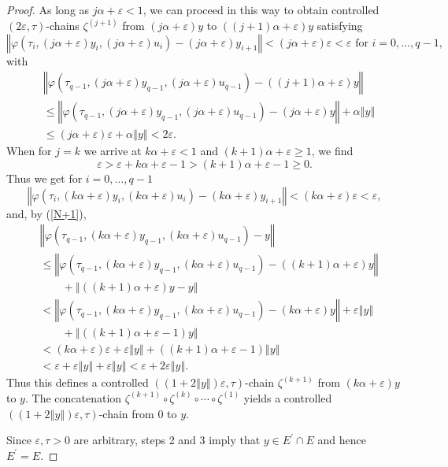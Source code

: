 \documentclass[10pt,a4paper]{amsart}
\begin{document}
\begin{proof}
As long as $j\alpha+\varepsilon<1$, we can proceed in this way to obtain
controlled $(2\varepsilon,\tau)$-chains $\zeta^{(j+1)}$ from $(j\alpha
+\varepsilon)y$ to $((j+1)\alpha+\varepsilon)y$ satisfying%
\[
\left\Vert \varphi(\tau_{i},(j\alpha+\varepsilon)y_{i},(j\alpha+\varepsilon
)u_{i})-(j\alpha+\varepsilon)y_{i+1}\right\Vert <(j\alpha+\varepsilon
)\varepsilon<\varepsilon\text{ for }i=0,\ldots,q-1,
\]
with%
\begin{align*}
&  \left\Vert \varphi(\tau_{q-1},(j\alpha+\varepsilon)y_{q-1},(j\alpha
+\varepsilon)u_{q-1})-((j+1)\alpha+\varepsilon)y\right\Vert \\
&  \leq\left\Vert \varphi(\tau_{q-1},(j\alpha+\varepsilon)y_{q-1}%
,(j\alpha+\varepsilon)u_{q-1})-(j\alpha+\varepsilon)y\right\Vert
+\alpha\left\Vert y\right\Vert \\
&  \leq(j\alpha+\varepsilon)\varepsilon+\alpha\left\Vert y\right\Vert
<2\varepsilon.
\end{align*}
When for $j=k$ we arrive at $k\alpha+\varepsilon<1$ and $(k+1)\alpha
+\varepsilon\geq1$, we find%
\begin{equation}
\varepsilon>\varepsilon+k\alpha+\varepsilon-1>(k+1)\alpha+\varepsilon-1\geq0.
\label{N+1}%
\end{equation}
Thus we get for $i=0,\ldots,q-1$%
\[
\left\Vert \varphi(\tau_{i},(k\alpha+\varepsilon)y_{i},(k\alpha+\varepsilon
)u_{i})-(k\alpha+\varepsilon)y_{i+1}\right\Vert <(k\alpha+\varepsilon
)\varepsilon<\varepsilon,
\]
and, by (\ref{N+1}),%
\begin{align*}
&  \left\Vert \varphi(\tau_{q-1},(k\alpha+\varepsilon)y_{q-1},(k\alpha
+\varepsilon)u_{q-1})-y\right\Vert \\
&  \leq\left\Vert \varphi(\tau_{q-1},(k\alpha+\varepsilon)y_{q-1}%
,(k\alpha+\varepsilon)u_{q-1})-((k+1)\alpha+\varepsilon)y\right\Vert \\
&  \qquad+\left\Vert ((k+1)\alpha+\varepsilon)y-y\right\Vert \\
&  <\left\Vert \varphi(\tau_{q-1},(k\alpha+\varepsilon)y_{q-1},(k\alpha
+\varepsilon)u_{q-1})-(k\alpha+\varepsilon)y\right\Vert +\varepsilon\left\Vert
y\right\Vert \\
&  \qquad+\left\Vert ((k+1)\alpha+\varepsilon-1)y\right\Vert \\
&  <(k\alpha+\varepsilon)\varepsilon+\varepsilon\left\Vert y\right\Vert
+((k+1)\alpha+\varepsilon-1)\left\Vert y\right\Vert \\
&  <\varepsilon+\varepsilon\left\Vert y\right\Vert +\varepsilon\left\Vert
y\right\Vert <\varepsilon+2\varepsilon\left\Vert y\right\Vert .
\end{align*}
Thus this defines a controlled $((1+2\left\Vert y\right\Vert )\varepsilon
,\tau)$-chain $\zeta^{(k+1)}$ from $(k\alpha+\varepsilon)y$ to $y$. The
concatenation $\zeta^{(k+1)}\circ\zeta^{(k)}\circ\cdots\circ\zeta^{(1)}$
yields a controlled $((1+2\left\Vert y\right\Vert )\varepsilon,\tau)$-chain
from $0$ to $y$.

Since $\varepsilon,\tau>0$ are arbitrary, steps 2 and 3 imply that $y\in
E^{\prime}\cap E$ and hence $E^{\prime}=E$.
\end{proof}
\end{document}
